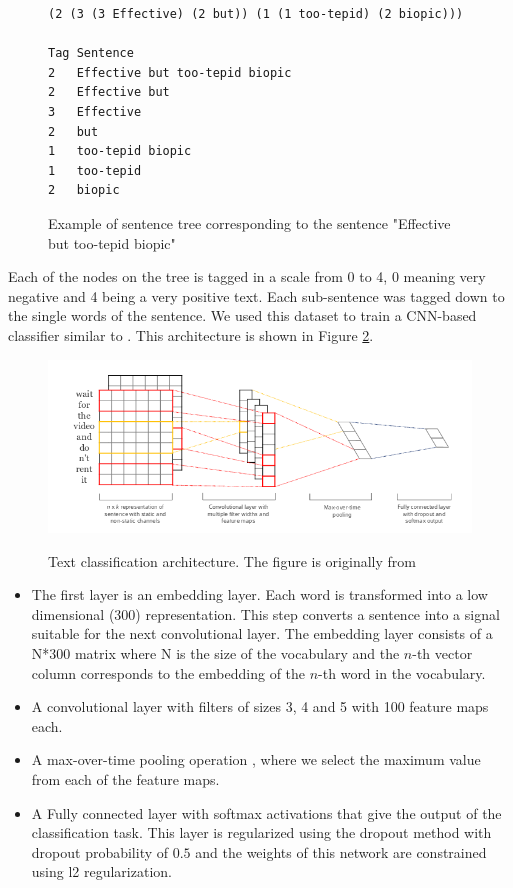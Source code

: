 \begin{figure}[h]
    \begin{lstlisting}[basicstyle=\small,frame=single]
(2 (3 (3 Effective) (2 but)) (1 (1 too-tepid) (2 biopic)))

Tag Sentence
2   Effective but too-tepid biopic
2   Effective but
3   Effective
2   but
1   too-tepid biopic
1   too-tepid
2   biopic
    \end{lstlisting}
    \label{fig:tree}
    \caption{Example of sentence tree corresponding to the sentence "Effective but too-tepid biopic"}
\end{figure}

Each of the nodes on the tree is tagged in a scale from 0 to 4, 0 meaning very negative and 4 being a very positive text. Each sub-sentence was tagged down to the single words of the sentence. We used this dataset to train a CNN-based classifier similar to \cite{DBLP:journals/corr/Kim14f}. This architecture is shown in Figure \ref{fig:cnn-sa}.

\begin{figure}[h]
    \centering
    \includegraphics[width=15cm]{figures/cnn}
    \label{fig:cnn-sa}
    \caption{Text classification architecture. The figure is originally from \cite{DBLP:journals/corr/Kim14f}}
\end{figure}


\begin{itemize}
    \item The first layer is an embedding layer. Each word is transformed into a low dimensional (300) representation. This step converts a sentence into a signal suitable for the next convolutional layer. The embedding layer consists of a N*300 matrix where N is the size of the vocabulary and the $n$-th vector column corresponds to the embedding of the $n$-th word in the vocabulary.
    \item A convolutional layer with filters of sizes 3, 4 and 5 with 100 feature maps each. 
    \item A max-over-time pooling operation \cite{collobert2011natural}, where we select the maximum value from each of the feature maps.
    \item A Fully connected layer with softmax activations that give the output of the classification task. This layer is regularized using the dropout method with dropout probability of $0.5$ \cite{srivastava2014dropout} and the weights of this network are constrained using l2 regularization.
\end{itemize}

